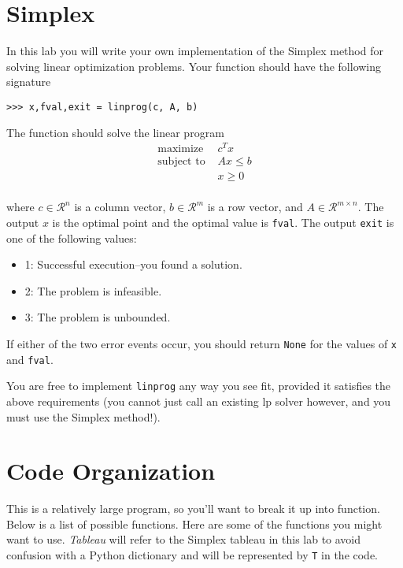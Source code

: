 \label{lab:Simplex}



\section*{Simplex}
In this lab you will write your own implementation of the Simplex method for solving linear optimization problems. Your function should have the following signature

\begin{lstlisting}
>>> x,fval,exit = linprog(c, A, b)
\end{lstlisting}

The function should solve the linear program
\begin{align*}
	\text{maximize } & c^T x \\
	\text{subject to }  & Ax \leq b \\
			&x \geq 0\\
\end{align*}

where $c \in \mathcal{R}^n$ is a column vector, $b \in \mathcal{R}^m$ is a row vector, and $A \in \mathcal{R}^{m \times n}$. The output $x$ is the optimal point and the optimal value is {\tt fval}. The output {\tt exit} is one of the following values:
\begin{itemize}
	\item 1: Successful execution--you found a solution.
	\item 2: The problem is infeasible.
	\item 3: The problem is unbounded.
\end{itemize}
If either of the two error events occur, you should return {\tt None} for the values of {\tt x} and {\tt fval}.

You are free to implement {\tt linprog} any way you see fit, provided it satisfies the above requirements (you cannot just call an existing lp solver however, and you must use the Simplex method!).


\section*{Code Organization}
This is a relatively large program, so you'll want to break it up into function. Below is a list of possible functions.
Here are some of the functions you might want to use. \emph{Tableau} will refer to the Simplex tableau in this lab to avoid confusion with a Python dictionary and will be represented by {\tt T}  in the code.


